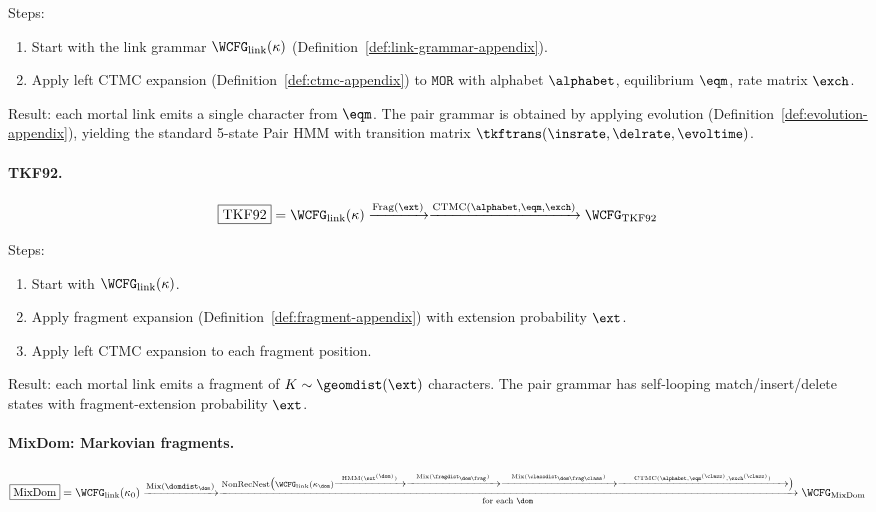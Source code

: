 \noindent Steps:
\begin{enumerate}
\item Start with the link grammar $\WCFG_{\mathrm{link}}(\kappa)$
  (Definition~\ref{def:link-grammar-appendix}).
\item Apply left CTMC expansion (Definition~\ref{def:ctmc-appendix}) to
  $\texttt{MOR}$ with alphabet $\alphabet$, equilibrium $\eqm$,
  rate matrix $\exch$.
\end{enumerate}
Result: each mortal link emits a single character from $\eqm$.
The pair grammar is obtained by applying evolution
(Definition~\ref{def:evolution-appendix}), yielding the standard 5-state
Pair HMM with transition matrix $\tkftrans(\insrate, \delrate, \evoltime)$.

\paragraph{TKF92.}

\begin{equation*}
\boxed{\text{TKF92}} =
\WCFG_{\mathrm{link}}(\kappa)
\xrightarrow{\text{Frag}(\ext)}
\xrightarrow{\text{CTMC}(\alphabet, \eqm, \exch)}
\WCFG_{\mathrm{TKF92}}
\end{equation*}

\noindent Steps:
\begin{enumerate}
\item Start with $\WCFG_{\mathrm{link}}(\kappa)$.
\item Apply fragment expansion (Definition~\ref{def:fragment-appendix})
  with extension probability $\ext$.
\item Apply left CTMC expansion to each fragment position.
\end{enumerate}
Result: each mortal link emits a fragment of $K \sim \geomdist(\ext)$
characters.  The pair grammar has self-looping match/insert/delete
states with fragment-extension probability $\ext$.

\paragraph{MixDom: Markovian fragments.}

\begin{equation*}
\boxed{\text{MixDom}} =
\WCFG_{\mathrm{link}}(\kappa_0)
\xrightarrow{\text{Mix}(\domdist_\dom)}
\xrightarrow[\text{for each } \dom]{\text{NonRecNest}\bigl(
  \WCFG_{\mathrm{link}}(\kappa_\dom)
  \xrightarrow{\text{HMM}(\ext^{(\dom)})}
  \xrightarrow{\text{Mix}(\fragdist_{\dom\frag})}
  \xrightarrow{\text{Mix}(\classdist_{\dom\frag\class})}
  \xrightarrow{\text{CTMC}(\alphabet, \eqm^{(\class)}, \exch^{(\class)})}
\bigr)}
\WCFG_{\mathrm{MixDom}}
\end{equation*}


